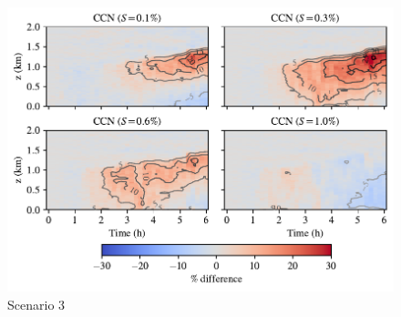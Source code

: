 \newpage
\begin{figure}[h]
  \centering
    \includegraphics[width=\textwidth]{figures/chapter5/height-time-ccn-pdiff-point-source-1x1.pdf}
    \caption{Scenario 3}
    \label{fig:ht-ccn-pdiff-s3}
\end{figure}

